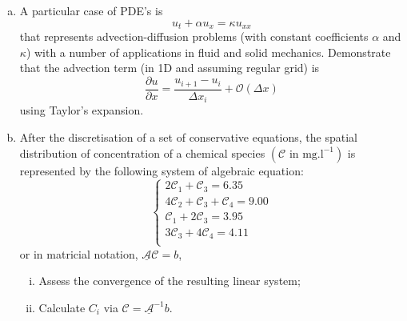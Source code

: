 \documentclass[calculator,datasheet,resit]{exam}
\newcommand{\frc}{\displaystyle\frac}
\begin{document}
\clearpage

\begin{question}
\begin{enumerate}[(a)]
 \item A particular case of PDE's is
\begin{displaymath}
u_{t}+\alpha u_{x} = \kappa u_{xx}
\end{displaymath}
that represents advection-diffusion problems (with constant coefficients $\alpha$ and $\kappa$) with a number of applications in fluid and solid mechanics. Demonstrate that the advection term (in 1D and assuming regular grid) is
\begin{displaymath}
\frc{\partial u}{\partial x}=\frc{u_{i+1}-u_{i}}{\Delta x_{i}} + \mathcal{O}\left(\Delta x\right)
\end{displaymath}
using Taylor's expansion.~

\item After the discretisation of a set of conservative equations, the spatial distribution of concentration of a chemical species $\left(\mathcal{C}\text{ in mg.l}^{-1}\right)$ is represented by the following system of algebraic equation:
 \begin{displaymath}
\begin{cases}
2\mathcal{C}_{1} +   \mathcal{C}_{3} = 6.35 \\
4\mathcal{C}_{2} +   \mathcal{C}_{3} + \mathcal{C}_{4} = 9.00 \\
 \mathcal{C}_{1} +  2\mathcal{C}_{3} = 3.95 \\
 3\mathcal{C}_{3} + 4\mathcal{C}_{4} = 4.11 \\
\end{cases}\label{linalg:eqnform} 
\end{displaymath}
or in matricial notation, $\underline{\mathcal{A}}\mathcal{C} = b$, 

\begin{enumerate}[(i)]
\item Assess the convergence of the resulting linear system;~
\item Calculate $C_{i}$ via $\mathcal{C} = \underline{\mathcal{A}}^{-1}b$.~

\end{enumerate}

\end{enumerate}

\end{question}

\vfill


\paperend
\end{document}
